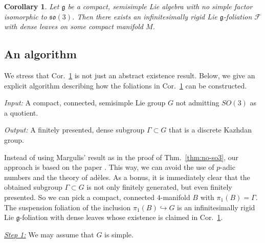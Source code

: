 \documentclass[11pt, letterpaper, oneside,reqno]{amsart}
\theoremstyle{plain}
\newtheorem{cor}[thm]{Corollary}
\theoremstyle{underline}
\theoremstyle{definition}
\theoremstyle{remark}
\begin{document}
	\begin{cor}\label{cor:existence}
		Let $\mathfrak{g}$ be a compact, semisimple Lie algebra with no simple factor isomorphic to $\mathfrak{so}(3)$. Then there exists an infinitesimally rigid Lie $\mathfrak{g}$-foliation $\mathcal{F}$ with dense leaves on some compact manifold $M$.
	\end{cor}
	
\subsection{An algorithm}
	We stress that Cor.~\ref{cor:existence} is not just an abstract existence result. Below, we give an explicit algorithm describing how the foliations in Cor.~\ref{cor:existence} can be constructed. 
	
	\vspace{0.2cm}
	
	\emph{Input:} A compact, connected, semisimple Lie group $G$ not admitting $SO(3)$ as a quotient.
	
	\emph{Output:} A finitely presented, dense subgroup $\Gamma\subset G$ that is a discrete Kazhdan group.
	
	\vspace{0.2cm}
	
	Instead of using Margulis' result \cite[Chapter~III, Prop.~7]{Margulis} as in the proof of Thm.~\ref{thm:no-so3}, our approach is based on the paper \cite{Cornulier}. This way, we can avoid the use of $p$-adic numbers and the theory of adèles. As a bonus, it is immediately clear that the obtained subgroup $\Gamma\subset G$ is not only finitely generated, but even finitely presented. So we can pick a compact, connected $4$-manifold $B$ with $\pi_1(B)=\Gamma$. The suspension foliation of the inclusion $\pi_1(B)\hookrightarrow G$ is an infinitesimally rigid Lie $\mathfrak{g}$-foliation with dense leaves whose existence is claimed in Cor.~\ref{cor:existence}.
	
	\vspace{0.2cm}
	\underline{\emph{Step 1:}} We may assume that $G$ is simple.
	
\end{document}
